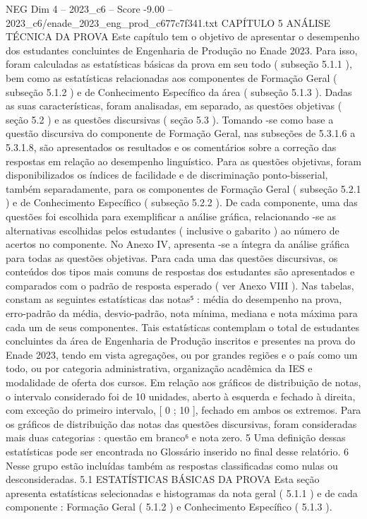 \begin{textsample}{NEG Dim 4 – 2023\_c6 – Score -9.00 – 2023\_c6/enade\_2023\_eng\_prod\_c677c7f341.txt}  \label{ex:f4_neg_013}
CAPÍTULO 5 ANÁLISE TÉCNICA DA PROVA Este capítulo tem o objetivo de apresentar o desempenho dos estudantes concluintes de Engenharia de Produção no Enade 2023.
Para isso, foram calculadas as estatísticas básicas da prova em seu todo ( subseção 5.1.1 ), bem como as estatísticas relacionadas aos componentes de Formação Geral ( subseção 5.1.2 ) e de Conhecimento Específico da área ( subseção 5.1.3 ).
Dadas as suas características, foram analisadas, em separado, as questões objetivas ( seção 5.2 ) e as questões discursivas ( seção 5.3 ).
Tomando -se como base a questão discursiva do componente de Formação Geral, nas subseções de 5.3.1.6 a 5.3.1.8, são apresentados os resultados e os comentários sobre a correção das respostas em relação ao desempenho linguístico.
Para as questões objetivas, foram disponibilizados os índices de facilidade e de discriminação ponto-bisserial, também separadamente, para os componentes de Formação Geral ( subseção 5.2.1 ) e de Conhecimento Específico ( subseção 5.2.2 ).
De cada componente, uma das questões foi escolhida para exemplificar a análise gráfica, relacionando -se as alternativas escolhidas pelos estudantes ( inclusive o gabarito ) ao número de acertos no componente.
No Anexo IV, apresenta -se a íntegra da análise gráfica para todas as questões objetivas.
Para cada uma das questões discursivas, os conteúdos dos tipos mais comuns de respostas dos estudantes são apresentados e comparados com o padrão de resposta esperado ( ver Anexo VIII ).
Nas tabelas, constam as seguintes estatísticas das notas⁵ : média do desempenho na prova, erro-padrão da média, desvio-padrão, nota mínima, mediana e nota máxima para cada um de seus componentes.
Tais estatísticas contemplam o total de estudantes concluintes da área de Engenharia de Produção inscritos e presentes na prova do Enade 2023, tendo em vista agregações, ou por grandes regiões e o país como um todo, ou por categoria administrativa, organização acadêmica da IES e modalidade de oferta dos cursos.
Em relação aos gráficos de distribuição de notas, o intervalo considerado foi de 10 unidades, aberto à esquerda e fechado à direita, com exceção do primeiro intervalo, [ 0 ; 10 ], fechado em ambos os extremos.
Para os gráficos de distribuição das notas das questões discursivas, foram consideradas mais duas categorias : questão em branco⁶ e nota zero. 5 Uma definição dessas estatísticas pode ser encontrada no Glossário inserido no final desse relatório. 6 Nesse grupo estão incluídas também as respostas classificadas como nulas ou desconsideradas. 5.1 ESTATÍSTICAS BÁSICAS DA PROVA Esta seção apresenta estatísticas selecionadas e histogramas da nota geral ( 5.1.1 ) e de cada componente : Formação Geral ( 5.1.2 ) e Conhecimento Específico ( 5.1.3 ).

\end{textsample}
